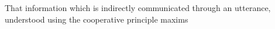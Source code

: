 That information which is indirectly communicated through an utterance, understood using the cooperative principle maxims
